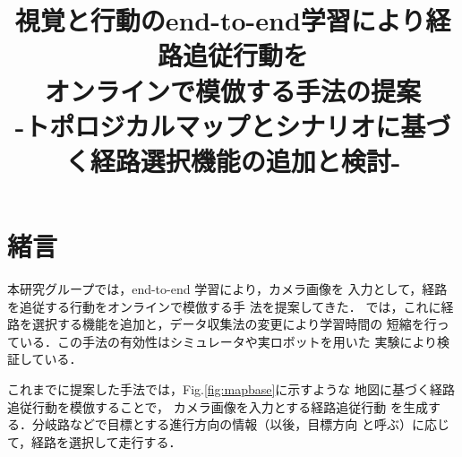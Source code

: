 \documentclass{sice-si}
\title{視覚と行動のend-to-end学習により経路追従行動を\\
オンラインで模倣する手法の提案\\
-トポロジカルマップとシナリオに基づく経路選択機能の追加と検討-\\} %
\begin{document}

\maketitle

\section{緒言}

本研究グループでは，end-to-end 学習により，カメラ画像を
入力として，経路を追従する行動をオンラインで模倣する手
法を提案してきた．\cite{okada2020}\cite{okada2021}\cite{kiyooka2021}
\cite{takahashi2023}\cite{imai2023}
\cite{haruyama2022}\cite{fujiwara2023}
では，これに経路を選択する機能を追加と，データ収集法の変更により学習時間の
短縮を行っている．この手法の有効性はシミュレータや実ロボットを用いた
実験により検証している．

\par
これまでに提案した手法では，Fig.\ref{fig:mapbase}に示すような
地図に基づく経路追従行動を模倣することで，
カメラ画像を入力とする経路追従行動
を生成する．分岐路などで目標とする進行方向の情報（以後，目標方向
と呼ぶ）に応じて，経路を選択して走行する．\par
\end{document}
